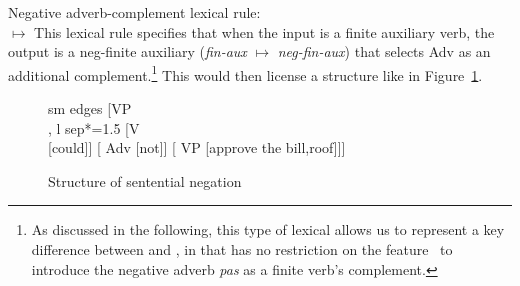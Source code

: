 \documentclass[output=paper
	        ,collection
	        ,collectionchapter
 	        ,biblatex
                ,babelshorthands
                ,newtxmath
                ,draftmode
                ,colorlinks, citecolor=brown
]{langscibook}
\begin{document}
\begin{exe}
\begin{xlist}
\begin{exe}
\begin{xlist}
\ea
Negative adverb-complement lexical rule:\\
 $\mapsto$
\z
%
This lexical rule specifies that when the input is a finite auxiliary verb,
the output is a neg-finite auxiliary (\textit{fin-aux} $\mapsto$ \textit{neg-fin-aux})
that selects Adv as an additional complement.\footnote{As
discussed in the following, this type of lexical allows us
to represent a key difference between  and , in that
 has no restriction on the feature \AUX\ to introduce the negative
adverb {\it pas}
as a finite verb's complement.}  This would then
license a structure like in Figure~\ref{negation-fig:6}.


\begin{figure}
	\begin{forest}
		sm edges
		[VP\\
		, l sep*=1.5
			[V\\
				[could]]
			[ Adv
				[not]]
			[ VP
				[approve the bill,roof]]]
	\end{forest}
\caption{Structure of sentential negation}\label{negation-fig:6}
\end{figure}


\end{xlist}
\end{exe}
\end{xlist}
\end{exe}
\end{document}
